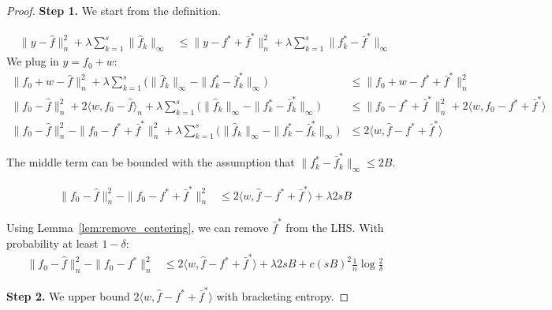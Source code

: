 \begin{proof}

\textbf{Step 1.} We start from the definition. 

\begin{align*}
\| y - \hat{f} \|_n^2 + \lambda \sum_{k=1}^s \| \hat{f}_k \|_\infty &\leq
  \| y - f^* + \bar{f}^* \|_n^2 + \lambda \sum_{k=1}^s \| f^*_k - \bar{f}^* \|_\infty 
\end{align*}
We plug in $y = f_0 + w$:
\begin{align*}
\| f_0 + w - \hat{f} \|_n^2 + \lambda \sum_{k=1}^s \Big( \| \hat{f}_k \|_\infty - 
    \| f^*_k - \bar{f}^*_k \|_\infty \Big) &\leq \|f_0 + w - f^* + \bar{f}^* \|_n^2 \\
\| f_0 - \hat{f} \|_n^2 + 2\langle w, f_0 - \hat{f} \rangle_n 
     +\lambda \sum_{k=1}^s \Big( \| \hat{f}_k \|_\infty - \|f^*_k -\bar{f}^*_k\|_\infty \Big) 
    &\leq \| f_0 - f^* + \bar{f}^* \|_n^2 + 
    2 \langle w, f_0 - f^* + \bar{f}^* \rangle \\
\|f_0 - \hat{f} \|_n^2 - \| f_0 - f^* + \bar{f}^* \|_n^2 + 
    \lambda \sum_{k=1}^s \Big( \| \hat{f}_k \|_\infty - 
 \| f^*_k - \bar{f}^*_k \|_\infty \Big) &\leq 2 \langle w, \hat{f} - f^* + \bar{f}^* \rangle
\end{align*}

The middle term can be bounded with the assumption that $\|f^*_k - \bar{f}^*_k \|_\infty \leq 2B$.

\begin{align*}
\|f_0 - \hat{f} \|_n^2 - \| f_0 - f^* + \bar{f}^* \|_n^2 
   &\leq 2 \langle w, \hat{f} - f^* + \bar{f}^* \rangle + \lambda 2 s B 
\end{align*}

Using Lemma~\ref{lem:remove_centering}, we can remove $\bar{f}^*$ from the LHS. With probability at least $1 - \delta$:
\begin{align}
\label{eqn:first_step_inequality}
\|f_0 - \hat{f} \|_n^2 - \| f_0 - f^* \|_n^2 
   &\leq 2 \langle w, \hat{f} - f^* + \bar{f}^* \rangle + \lambda 2 s B + c(sB)^2 \frac{1}{n} \log \frac{2}{\delta}
\end{align}



\textbf{Step 2.} We upper bound $2 \langle w, \hat{f} - f^* + \bar{f}^* \rangle$ with bracketing entropy.


\end{proof}
